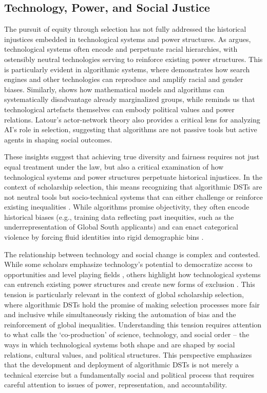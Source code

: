 \subsection{Technology, Power, and Social Justice}\label{ssec:context_tech_power_justice}
The pursuit of equity through selection has not fully addressed the historical injustices embedded in technological systems and power structures. As \textcite{benjamin2019race} argues, technological systems often encode and perpetuate racial hierarchies, with ostensibly neutral technologies serving to reinforce existing power structures. This is particularly evident in algorithmic systems, where \textcite{noble2018algorithms} demonstrates how search engines and other technologies can reproduce and amplify racial and gender biases. Similarly, \textcite{oneill2016weapons} shows how mathematical models and algorithms can systematically disadvantage already marginalized groups, while \textcite{winner1980artefacts} reminds us that technological artefacts themselves can embody political values and power relations. Latour's actor-network theory also provides a critical lens for analyzing AI's role in selection, suggesting that algorithms are not passive tools but active agents in shaping social outcomes.

These insights suggest that achieving true diversity and fairness requires not just equal treatment under the law, but also a critical examination of how technological systems and power structures perpetuate historical injustices. In the context of scholarship selection, this means recognizing that algorithmic DSTs are not neutral tools but socio-technical systems that can either challenge or reinforce existing inequalities \cite{barocas2023fairness}. While algorithms promise objectivity, they often encode historical biases (e.g., training data reflecting past inequities, such as the underrepresentation of Global South applicants) and can enact categorical violence by forcing fluid identities into rigid demographic bins \cite{scheuerman2019computers}.

The relationship between technology and social change is complex and contested. While some scholars emphasize technology's potential to democratize access to opportunities and level playing fields \cite{rheingold2002smart}, others highlight how technological systems can entrench existing power structures and create new forms of exclusion \cite{eubanks2018automating}. This tension is particularly relevant in the context of global scholarship selection, where algorithmic DSTs hold the promise of making selection processes more fair and inclusive while simultaneously risking the automation of bias and the reinforcement of global inequalities. Understanding this tension requires attention to what \textcite{jasanoff2004states} calls the `co-production' of science, technology, and social order – the ways in which technological systems both shape and are shaped by social relations, cultural values, and political structures. This perspective emphasizes that the development and deployment of algorithmic DSTs is not merely a technical exercise but a fundamentally social and political process that requires careful attention to issues of power, representation, and accountability.

